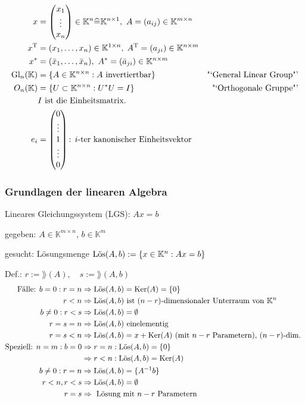\begin{align*}
x &= \begin{pmatrix} x_1 \\ \vdots \\ x_n \end{pmatrix}
\in \mathbb{K}^n \widehat{=} \mathbb{K}^{n \times 1},
~ A=(a_{ij}) \in \mathbb{K}^{m \times n}  \\
x^\mathrm T &= (x_1, \dots, x_n) \in \mathbb{K}^{1 \times n},\;
A^\mathrm T = (a_{ji}) \in \mathbb{K}^{n \times m}  \\
x^{\ast} &= (\bar{x}_1, \dots, \bar{x}_n),
~A^{\ast} = (\bar{a}_{ji}) \in \mathbb{K}^{n \times m}  \\
\mathrm{Gl}_n(\mathbb K) &= \{A \in \mathbb{K}^{n \times n}: A
\text{ invertiertbar} \} & \text{"`General Linear Group"'}  \\
O_n (\mathbb{K})&= \{ U \subset \mathbb{K}^{n \times n}:
U^{\ast} U = I \} & \text{"`Orthogonale Gruppe"'} \\
& I \text{ ist die Einheitsmatrix.} \\
e_i &= \begin{pmatrix} 0 \\ \vdots \\ 1 \\ \vdots \\ 0 \end{pmatrix}
\text{:  $i$-ter kanonischer Einheitsvektor } \\
\end{align*}

\subsubsection{Grundlagen der linearen Algebra}

Lineares Gleichungssystem (LGS): $Ax=b$

gegeben: $A \in \mathbb{K}^{m \times n}$, $b \in \mathbb{K}^m$

gesucht: Lösungsmenge $\mathrm{L\ddot{o}s}(A,b) := \{x \in \mathbb{K}^n : Ax=b\} $


Def.: $r := \rang(A),\quad s := \rang(A,b)$
\begin{align*}
\text{Fälle: } b =0 : r = n &\Rightarrow \mathrm{L\ddot{o}s}(A,b)=\operatorname*{\mathrm{Ker}}(A)=\{0\}\\
r<n &\Rightarrow \mathrm{L\ddot{o}s}(A,b) \text{ ist $(n-r)$-dimensionaler Unterraum
von } \mathbb{K}^n \\
b \neq 0: r<s &\Rightarrow \mathrm{L\ddot{o}s}(A,b) = \emptyset \\
r=s=n &\Rightarrow \mathrm{L\ddot{o}s}(A,b) \text{ einelementig }\\
r=s<n &\Rightarrow \mathrm{L\ddot{o}s}(A,b) = x + \operatorname*{\mathrm{Ker}}(A)
\text{ (mit $n-r$ Parametern), $(n-r)$-dim. } \\
\text{Speziell: } n=m: b=0 &\Rightarrow r=n: \mathrm{L\ddot{o}s}(A,b) = \{0\}\\
&\Rightarrow r<n: \mathrm{L\ddot{o}s}(A,b) = \operatorname*{\mathrm{Ker}}(A)\\
b \neq 0: r=n &\Rightarrow \mathrm{L\ddot{o}s}(A,b) = \{A^{-1}b\}\\
	r<n, r<s &\Rightarrow \mathrm{L\ddot{o}s}(A,b) = \emptyset \\
	 r=s &\Rightarrow \text{ Lösung mit $n-r$ Parametern } \\
\end{align*}

